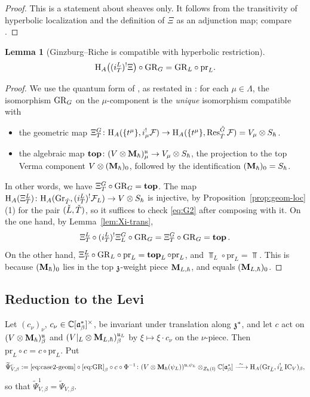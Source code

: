 \documentclass{article}
\theoremstyle{plain}
\newtheorem{lemma}[theorem]{Lemma}
\theoremstyle{definition}
\theoremstyle{remark}
\numberwithin{equation}{section}
\begin{document}
\begin{proof}
This is a statement about sheaves only. It follows from the transitivity of hyperbolic localization and the definition of $\Xi$ as an adjunction map; compare \cite[\S1.3, \S2.4]{macerato2023leviequivariantrestrictionsphericalperverse}.
\end{proof}

\begin{lemma}[Ginzburg--Riche is compatible with hyperbolic restriction]\label{lem:G2}
\begin{equation}\label{eq:G2}
\mathrm{H}_A\bigl((i^L_T)^!\Xi\bigr)\circ\mathrm{GR}_G=\mathrm{GR}_L\circ\mathrm{pr}_L .
\end{equation}
\end{lemma}

\begin{proof}
We use the quantum form of \cite[Theorem 2.3.1]{ginzburg2014differentialoperatorsguaffine}, as restated in \cite[Theorem 1.4.4]{macerato2023leviequivariantrestrictionsphericalperverse}: for each $\mu\in\Lambda$, the isomorphism $\mathrm{GR}_G$ on the $\mu$-component is the \emph{unique} isomorphism compatible with
\begin{itemize}
\item the geometric map $\Xi^G_T\colon\mathrm{H}_A(\{t^\mu\},i_\mu^!\mathcal{F})\to\mathrm{H}_A(\{t^\mu\},\operatorname{Res}^{{\check{G}}}_{{\check{T}}}\mathcal{F})=V_\mu\otimes S_\hbar$.
\item the algebraic map $\operatorname{\mathbf{top}}\colon(V\otimes\mathbf{M}_\hbar)^{\mathfrak{u}}_\mu\to V_\mu\otimes S_\hbar$, the projection to the top Verma component  $V\otimes(\mathbf{M}_\hbar)_0$, followed by the identification $(\mathbf{M}_\hbar)_0=S_\hbar$.
\end{itemize}
In other words, we have $\Xi^G_T\circ\mathrm{GR}_G=\operatorname{\mathbf{top}}$. The map $\mathrm{H}_A(\Xi^L_T)\colon\mathrm{H}_A(\operatorname{Gr}_{{\check{T}}},(i^L_T)^!\mathcal{F}_L)\to V\otimes S_\hbar$ is injective, by Proposition~\ref{prop:geom-loc}(1) for the pair $(\check{L},{\check{T}})$, so it suffices to check \eqref{eq:G2} after composing with it. On the one hand, by Lemma~\ref{lem:Xi-trans},
\[
\Xi^L_T\circ(i^L_T)^!\Xi^G_L\circ\mathrm{GR}_G=\Xi^G_T\circ\mathrm{GR}_G=\operatorname{\mathbf{top}} .
\]
On the other hand, $\Xi^L_T\circ\mathrm{GR}_L\circ\mathrm{pr}_L=\operatorname{\mathbf{top}}_L\circ\mathrm{pr}_L$, and $\Top_L\circ\mathrm{pr}_L=\Top$. This is because $(\mathbf{M}_\hbar)_0$ lies in the top $\mathfrak{z}$-weight piece $\mathbf{M}_{L,\hbar}$, and equals $(\mathbf{M}_{L,\hbar})_0$.
\end{proof}

\subsection{Reduction to the Levi}\label{sec:cmp-reduction}
Let $(c_\nu)_\nu$, $c_\nu\in\mathbb{C}[\mathfrak{a}^*_{\beta}]^\times$, be invariant under translation along $\mathfrak{z}^*$, and let $c$ act on $(V\otimes\mathbf{M}_\hbar)^{\mathfrak{u}}_\beta$ and $(V|_L\otimes\mathbf{M}_{L,\hbar})^{\mathfrak{u}_L}_\beta$ by $\xi\mapsto\xi\cdot c_\nu$ on the $\nu$-piece. Then $\mathrm{pr}_L\circ c=c\circ\mathrm{pr}_L$. Put
\[
\widetilde\Psi^{c}_{V,\beta}:=\eqref{eq:case2-geom}\circ\eqref{eq:GR}_\beta\circ c\circ\Phi^{-1}\colon(V\otimes\bM_\hbar(\psiL))^{\fraku,\psiL}\otimes_{\Zh(\frakl)}\Cbe\xrightarrow{\ \sim\ }\H_A(\GrL,i_L^!\IC_V)_\beta ,
\]
so that $\widetilde\Psi^{1}_{V,\beta}=\widetilde\Psi_{V,\beta}$.
\end{document}
